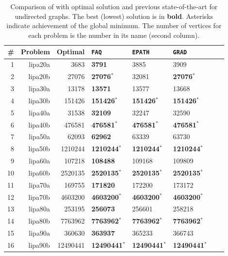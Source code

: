 \documentclass[10pt,journal,cspaper,compsoc]{IEEEtran}
\begin{document}
\begin{table}[h!]
\caption{Comparison of \FAQ with optimal solution and previous state-of-the-art for undirected graphs.  The best (lowest) solution is in \textbf{bold}. Asterisks indicate achievement of the global minimum.  The number of vertices for each problem is the number in its name (second column).}
\begin{center}
\begin{tabular}{|r|r|r||l|l|l|l|l|}
	\hline 
	          \# &  Problem &      Optimal & \texttt{FAQ} & \texttt{EPATH} & \texttt{GRAD} \\
	\hline 
	           1 &  lipa20a &     3683 & \textbf{3791} &     3885 &     3909 \\ 
	           2 &  lipa20b &    27076 & \textbf{27076}$^*$ &    32081 &    \textbf{27076}$^*$ \\ 
	           3 &  lipa30a &    13178 & \textbf{13571} 	&    13577 &    13668 \\ 
	           4 &  lipa30b &   151426 & \textbf{151426}$^*$ & \textbf{151426}$^*$ &   \textbf{151426}$^*$ \\ 
	           5 &  lipa40a &    31538 & \textbf{32109} 	&    32247 &    32590 \\ 
	           6 &  lipa40b &   476581 & \textbf{476581}$^*$ &   \textbf{476581}$^*$ &   \textbf{476581}$^*$ \\ 
	           7 &  lipa50a &    62093 & \textbf{62962} &    63339 &    63730 \\ 
	           8 &  lipa50b &  1210244 & \textbf{1210244}$^*$ &  \textbf{1210244}$^*$ &  \textbf{1210244}$^*$ \\ 
	           9 &  lipa60a &   107218 & \textbf{108488} &   109168 &   109809 \\ 
	          10 &  lipa60b &  2520135 & \textbf{2520135}$^*$ &  \textbf{2520135}$^*$ &  \textbf{2520135}$^*$ \\ 
	          11 &  lipa70a &   169755 & \textbf{171820} &   172200 &   173172 \\ 
	          12 &  lipa70b &  4603200 & \textbf{4603200}$^*$ &  \textbf{4603200}$^*$ &  \textbf{4603200}$^*$ \\ 
	          13 &  lipa80a &   253195 & \textbf{256073} &   256601 &   258218 \\ 
	          14 &  lipa80b &  7763962 & \textbf{7763962}$^*$ &  \textbf{7763962}$^*$ &  \textbf{7763962}$^*$ \\ 
	          15 &  lipa90a &   360630 & \textbf{363937} &   365233 &   366743 \\ 
	          16 &  lipa90b & 12490441 & \textbf{12490441}$^*$ & \textbf{12490441}$^*$ & \textbf{12490441}$^*$ \\ 
	\hline
	\end{tabular}
\end{center}
\label{tab:directed}
\end{table}%
\end{document}
